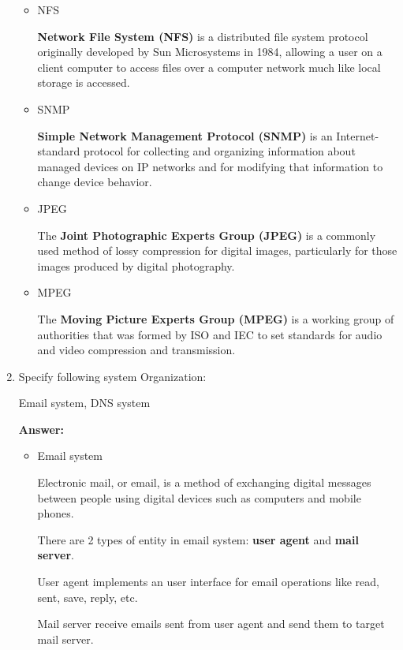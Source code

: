 \begin{enumerate}
\begin{itemize}
        \item NFS
        
        \textbf{Network File System (NFS)} is a distributed file system protocol originally developed by Sun Microsystems in 1984, allowing a user on a client computer to access files over a computer network much like local storage is accessed.
        
        \item SNMP
        
        \textbf{Simple Network Management Protocol (SNMP)} is an Internet-standard protocol for collecting and organizing information about managed devices on IP networks and for modifying that information to change device behavior.
        
        \item JPEG
        
        The \textbf{Joint Photographic Experts Group (JPEG)} is a commonly used method of lossy compression for digital images, particularly for those images produced by digital photography.
        
        \item MPEG
        
        The \textbf{Moving Picture Experts Group (MPEG)} is a working group of authorities that was formed by ISO and IEC to set standards for audio and video compression and transmission.
        
    \end{itemize}
    
    \item Specify following system Organization:
    
    Email system, DNS system
    
    \textbf{Answer:}
    
    \begin{itemize}
        \item Email system
        
        Electronic mail, or email, is a method of exchanging digital messages between people using digital devices such as computers and mobile phones.
        
        There are 2 types of entity in email system: \textbf{user agent} and \textbf{mail server}.
        
        User agent implements an user interface for email operations like read, sent, save, reply, etc.
        
        Mail server receive emails sent from user agent and send them to target mail server.
        

\end{itemize}
\end{enumerate}
